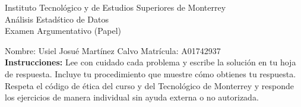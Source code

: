 \documentclass[10pt]{report}
\begin{document}
\newpage



\begin{center}
{\large Instituto Tecnol\'{o}gico y de Estudios Superiores de Monterrey \\
An\'alisis Estad\'stico de Datos } \\
Examen Argumentativo (Papel)
\end{center}

Nombre: \underline{\hspace*{.2in}}
Usiel Josu\'e Mart\'inez Calvo
\underline{\hspace*{.2in}} \quad Matr\'icula:\underline{\hspace*{.2in}}
A01742937
\underline{\hspace*{.2in}} \\

{\bf Instrucciones:} Lee con cuidado cada problema y escribe la soluci\'on
en tu hoja de respuesta. Incluye tu procedimiento que muestre c\'omo obtienes tu respuesta.  Respeta el c\'odigo de \'etica del curso y del Tecnol\'ogico de Monterrey y responde los ejercicios de manera individual sin ayuda externa o no autorizada.
\end{document}
